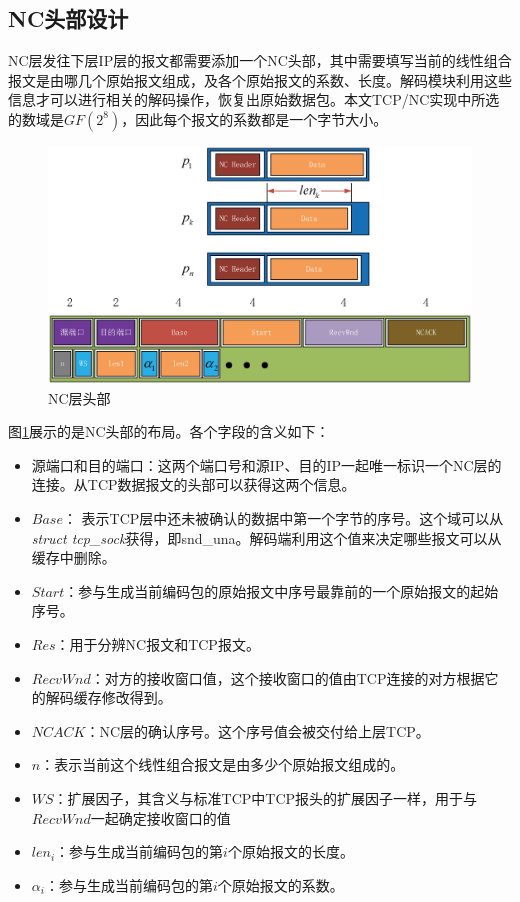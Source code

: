 \subsection{NC头部设计}
NC层发往下层IP层的报文都需要添加一个NC头部，其中需要填写当前的线性组合报文是由哪几个原始报文组成，及各个原始报文的系数、长度。解码模块利用这些信息才可以进行相关的解码操作，恢复出原始数据包。本文TCP/NC实现中所选的数域是$GF\left(2^8\right)$，因此每个报文的系数都是一个字节大小。
\begin{figure}[htbp] 
	\centering
	\includegraphics[width=5in]{figures/codingheader.eps}
	\caption{NC层头部}
	\label{CODINGHEADER_EPS}
\end{figure}
图\ref{CODINGHEADER_EPS}展示的是NC头部的布局。各个字段的含义如下：
\begin{itemize}[leftmargin=.5in]
	\item 源端口和目的端口：这两个端口号和源IP、目的IP一起唯一标识一个NC层的连接。从TCP数据报文的头部可以获得这两个信息。
	\item $Base$： 表示TCP层中还未被确认的数据中第一个字节的序号。这个域可以从\emph{struct tcp\_sock}获得，即snd\_una。解码端利用这个值来决定哪些报文可以从缓存中删除。
	\item $Start$：参与生成当前编码包的原始报文中序号最靠前的一个原始报文的起始序号。
	\item $Res$：用于分辨NC报文和TCP报文。
	\item $RecvWnd$：对方的接收窗口值，这个接收窗口的值由TCP连接的对方根据它的解码缓存修改得到。
	\item $NCACK$：NC层的确认序号。这个序号值会被交付给上层TCP。
	\item $n$：表示当前这个线性组合报文是由多少个原始报文组成的。
	\item $WS$：扩展因子，其含义与标准TCP中TCP报头的扩展因子一样，用于与$RecvWnd$一起确定接收窗口的值
	\item $len_{i}$：参与生成当前编码包的第$i$个原始报文的长度。
	\item $\alpha_{i}$：参与生成当前编码包的第$i$个原始报文的系数。
\end{itemize}
